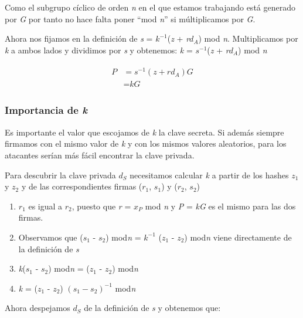 \documentclass[11pt]{article}
\begin{document}
Como el subgrupo cíclico de orden \textit{n} en el que estamos trabajando está generado por \textit{G} por tanto no hace falta poner ``mod \textit{n}'' si múltiplicamos por \textit{G}.


Ahora nos fijamos en la definición de \textit{s} = \textit{$k^{-1}$}(\textit{z} + \textit{r$d_A$}) mod \textit{n}. Multiplicamos por \textit{k} a ambos lados y dividimos por \textit{s} y obtenemos: \textit{k} = \textit{$s^{-1}$}(\textit{z} + \textit{r$d_A$}) mod \textit{n}

\begin{align}
\begin{split}
P &= \textit{$s^{-1}$}(\textit{z} + \textit{r$d_A$}) \textit{G}\\
&= \textit{kG}
\end{split}
\end{align}


\subsubsection*{Importancia de \textit{k}}

Es importante el valor que escojamos de \textit{k} la clave secreta. Si además siempre firmamos con el mismo valor de \textit{k} y con los mismos valores aleatorios, para los atacantes serían más fácil encontrar la clave privada.

Para descubrir la clave privada \textit{$d_S$} necesitamos calcular \textit{k} a partir de los hashes \textit{$z_1$} y \textit{$z_2$} y de las correspondientes firmas (\textit{$r_1$}, \textit{$s_1$}) y (\textit{$r_2$}, \textit{$s_2$})


\begin{enumerate}
	\item $r_1$ es igual a $r_2$, puesto que \textit{r} = \textit{$x_P$} mod \textit{n} y \textit{P} = \textit{kG} es el mismo para las dos firmas.
	\item Observamos que  (\textit{$s_1$} - \textit{$s_2$}) mod\textit{n} = \textit{$k^{-1}$} (\textit{$z_1$} - \textit{$z_2$}) mod\textit{n} viene directamente de la definición de \textit{s}
	\item \textit{k}(\textit{$s_1$} - \textit{$s_2$}) mod\textit{n} = (\textit{$z_1$} - \textit{$z_2$}) mod\textit{n}
	\item \textit{k}  = (\textit{$z_1$} - \textit{$z_2$}) $(\textit{$s_1$} - \textit{$s_2$})^{-1}$ mod\textit{n}
\end{enumerate}

Ahora despejamos \textit{$d_S$} de la definición de \textit{s} y obtenemos que:
\end{document}
